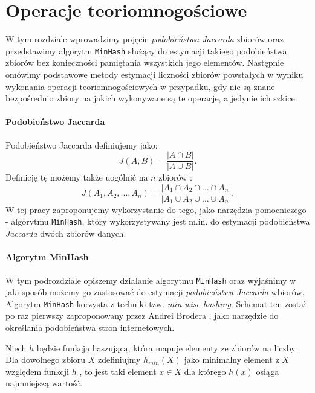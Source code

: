 \chapter{Operacje teoriomnogościowe}
\thispagestyle{chapterBeginStyle}

W tym rozdziale wprowadzimy pojęcie \textit{podobieństwa Jaccarda} zbiorów oraz przedstawimy algorytm \texttt{MinHash} służący do estymacji takiego podobieństwa zbiorów bez konieczności pamiętania wszystkich jego elementów.
 Następnie omówimy podstawowe metody estymacji liczności zbiorów powstałych w wyniku wykonania operacji teoriomnogościowych w przypadku, gdy nie są znane bezpośrednio zbiory na jakich wykonywane są te operacje, a jedynie ich szkice. 

\subsubsection{Podobieństwo Jaccarda}
Podobieństwo Jaccarda definiujemy jako:
\begin{equation}
    J(A, B) = \frac{|A \cap B|}{|A \cup B|}.
\end{equation}
Definicję tę możemy także uogólnić  na $n$ zbiorów \cite{adroll}:
\begin{equation}
    J(A_1, A_2, ..., A_n) = \frac{|A_1 \cap A_2 \cap ... \cap A_n|}{|A_1 \cup A_2 \cup ... \cup A_n|}.
    \label{jacc_multi}
\end{equation}
 W tej pracy zaproponujemy wykorzystanie do tego, jako narzędzia pomocniczego - algorytmu \texttt{MinHash}, który wykorzystywany jest m.in. do estymacji podobieństwa \textit{Jaccarda} dwóch zbiorów danych.

\subsubsection{Algorytm MinHash}
W tym podrozdziale opiszemy działanie algorytmu \texttt{MinHash} oraz wyjaśnimy w jaki sposób możemy go zastosować do estymacji \textit{podobieństwa Jaccarda} wbiorów.
Algorytm \texttt{MinHash} korzysta z techniki tzw. \textit{min-wise hashing}. Schemat ten został po raz pierwszy zaproponowany przez Andrei Brodera \cite{broder}, jako narzędzie do określania podobieństwa stron internetowych.

Niech $h$ będzie funkcją haszującą, która mapuje elementy ze zbiorów na liczby.
 Dla dowolnego zbioru $X$ zdefiniujmy $h_{min}(X)$ jako minimalny element z $X$ względem funkcji $h$ , to jest taki element $x \in X$ dla którego $h(x)$ osiąga najmniejszą wartość.

